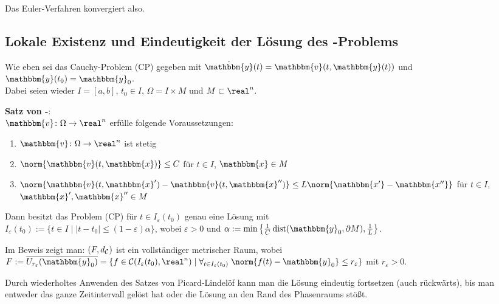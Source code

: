 Das Euler-Verfahren konvergiert also.

\subsection{%
    Lokale Existenz und Eindeutigkeit der Lösung des -Problems%
}

Wie eben sei das Cauchy-Problem (CP) gegeben mit
$\dot{\mathbbm{y}}(t) = \mathbbm{v}(t, \mathbbm{y}(t))$ und
$\mathbbm{y}(t_0) = \mathbbm{y}_0$. \\
Dabei seien wieder $I = [a, b]$, $t_0 \in I$, $\Omega = I \times M$ und
$M \subset \real^n$.

\textbf{Satz von -}: \\
$\mathbbm{v}\colon \Omega \rightarrow \real^n$ erfülle folgende
Voraussetzungen:
\begin{enumerate}
    \item
    $\mathbbm{v}\colon \Omega \rightarrow \real^n$ ist stetig
    
    \item
    $\norm{\mathbbm{v}(t, \mathbbm{x})} \le C$ für
    $t \in I$, $\mathbbm{x} \in M$
    
    \item
    $\norm{\mathbbm{v}(t, \mathbbm{x}') - \mathbbm{v}(t, \mathbbm{x}'')} \le
    L \norm{\mathbbm{x'} - \mathbbm{x''}}$ für
    $t \in I$, $\mathbbm{x}', \mathbbm{x}'' \in M$
\end{enumerate}
Dann besitzt das Problem (CP) für $t \in I_\varepsilon(t_0)$
genau eine Lösung mit \\
$I_\varepsilon(t_0) := \{t \in I \;|\;
|t - t_0| \le (1 - \varepsilon) \alpha\}$, wobei $\varepsilon > 0$ und
$\alpha := \min\left\{\frac{1}{C} \dist(\mathbbm{y}_0, \partial M),
\frac{1}{L}\right\}$.

Im Beweis zeigt man:
$(F, d_{\mathcal{C}})$ ist ein vollständiger metrischer Raum, wobei \\
$F := \overline{U_{r_\varepsilon}(\mathbbm{y}_0)} =
\{f \in \C(I_\varepsilon(t_0), \real^n) \;|\;
\forall_{t \in I_\varepsilon(t_0)}\;
\norm{f(t) - \mathbbm{y}_0} \le r_\varepsilon\}$ mit $r_\varepsilon > 0$.

\linie

Durch wiederholtes Anwenden des Satzes von Picard-Lindelöf kann man die Lösung
eindeutig fortsetzen (auch rückwärts), bis man entweder das ganze Zeitintervall
gelöst hat oder die Lösung an den Rand des Phasenraums stößt.


